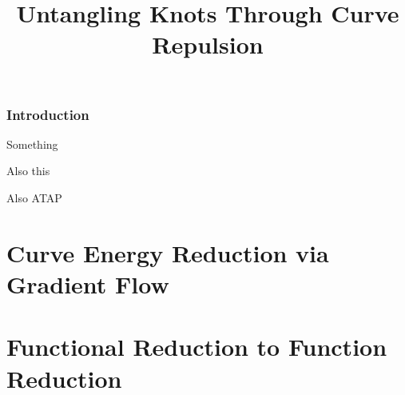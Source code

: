 \documentclass[a4paper, 12pt]{article}
\title{Untangling Knots Through Curve Repulsion}
\author{}
\begin{document}



\tableofcontents
\section{Introduction}


Something \cite{YSC2021}

Also this \cite{BO1995}

Also ATAP \cite{Trefethen_2020}

\newpage
\part{Curve Energy Reduction via Gradient Flow}

\newpage
\part{Functional Reduction to Function Reduction}

\printbibliography
\end{document}
